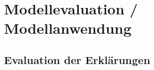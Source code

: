 \chapter{Modellevaluation / Modellanwendung}
\label{sec:model_evaluation}



\section{Evaluation der Erklärungen}





